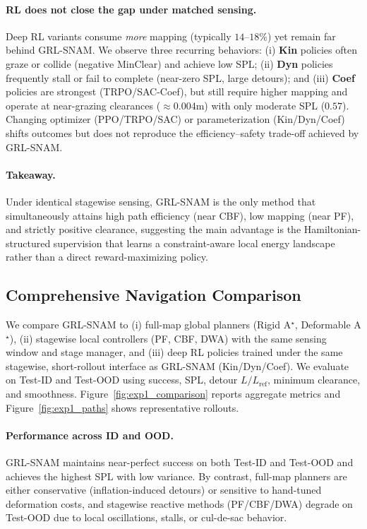 \documentclass{article} %
\begin{document}
\paragraph{RL does not close the gap under matched sensing.}
Deep RL variants consume \emph{more} mapping (typically $14$--$18\%$) yet remain far behind GRL-SNAM. We observe three recurring behaviors:
(i) \textbf{Kin} policies often graze or collide (negative MinClear) and achieve low SPL; 
(ii) \textbf{Dyn} policies frequently stall or fail to complete (near-zero SPL, large detours); and 
(iii) \textbf{Coef} policies are strongest (TRPO/SAC-Coef), but still require higher mapping and operate at near-grazing clearances ($\approx 0.004$m) with only moderate SPL ($0.57$). 
Changing optimizer (PPO/TRPO/SAC) or parameterization (Kin/Dyn/Coef) shifts outcomes but does not reproduce the efficiency--safety trade-off achieved by GRL-SNAM.

\paragraph{Takeaway.}
Under identical stagewise sensing, GRL-SNAM is the only method that simultaneously attains high path efficiency (near CBF), low mapping (near PF), and strictly positive clearance, suggesting the main advantage is the Hamiltonian-structured supervision that learns a constraint-aware local energy landscape rather than a direct reward-maximizing policy.


\subsection{Comprehensive Navigation Comparison}
\label{subsec:comprehensive_nav}

We compare GRL-SNAM to (i) full-map global planners (Rigid A$^{\star}$, Deformable A$^{\star}$), 
(ii) stagewise local controllers (PF, CBF, DWA) with the same sensing window and stage manager, 
and (iii) deep RL policies trained under the same stagewise, short-rollout interface as GRL-SNAM (Kin/Dyn/Coef).
We evaluate on Test-ID and Test-OOD using success, SPL, detour $L/L_{\mathrm{ref}}$, minimum clearance, and smoothness.
Figure~\ref{fig:exp1_comparison} reports aggregate metrics and Figure~\ref{fig:exp1_paths} shows representative rollouts.

\paragraph{Performance across ID and OOD.}
GRL-SNAM maintains near-perfect success on both Test-ID and Test-OOD and achieves the highest SPL with low variance.
By contrast, full-map planners are either conservative (inflation-induced detours) or sensitive to hand-tuned deformation costs, and stagewise reactive methods (PF/CBF/DWA) degrade on Test-OOD due to local oscillations, stalls, or cul-de-sac behavior.
\end{document}

